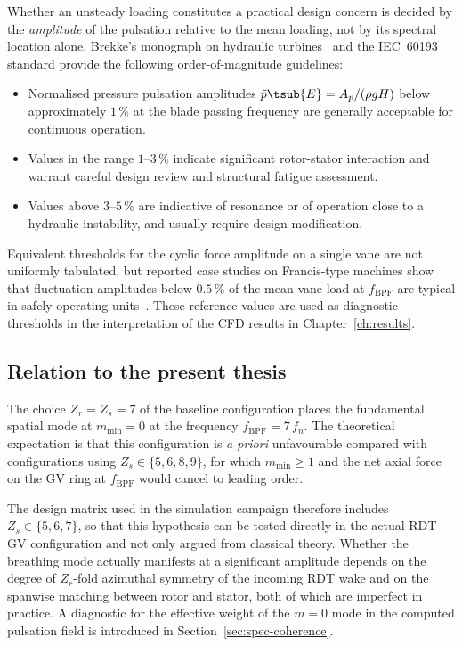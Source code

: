Whether an unsteady loading constitutes a practical design concern
is decided by the \emph{amplitude} of the pulsation relative to the
mean loading, not by its spectral location alone. Brekke's monograph
on hydraulic turbines~\cite{brekke,brekke2010} and the IEC~60193
standard provide the following order-of-magnitude guidelines:
\begin{itemize}
  \item Normalised pressure pulsation amplitudes
        $\tilde{p}\tsub{E} = A_p / (\rho g H)$ below approximately
        $1\,\%$ at the blade passing frequency are generally
        acceptable for continuous operation.
  \item Values in the range $1$--$3\,\%$ indicate significant
        rotor-stator interaction and warrant careful design review
        and structural fatigue assessment.
  \item Values above $3$--$5\,\%$ are indicative of resonance or of
        operation close to a hydraulic instability, and usually
        require design modification.
\end{itemize}
Equivalent thresholds for the cyclic force amplitude on a single
vane are not uniformly tabulated, but reported case studies on
Francis-type machines show that fluctuation amplitudes below
$0.5\,\%$ of the mean vane load at $f_{\mathrm{BPF}}$ are typical in
safely operating units~\cite{egusquiza2006}. These reference values
are used as diagnostic thresholds in the interpretation of the
\ac{CFD} results in Chapter~\ref{ch:results}.

\subsection{Relation to the present thesis}
\label{sec:rsi-thesis}

The choice $Z_r = Z_s = 7$ of the baseline configuration places the
fundamental spatial mode at $m_{\min} = 0$ at the frequency
$f_{\mathrm{BPF}} = 7\,f_n$. The theoretical expectation is that
this configuration is \emph{a priori} unfavourable compared with
configurations using $Z_s \in \{5,6,8,9\}$, for which
$m_{\min} \geq 1$ and the net axial force on the \ac{GV} ring at
$f_{\mathrm{BPF}}$ would cancel to leading order.

The design matrix used in the simulation campaign therefore includes
$Z_s \in \{5,6,7\}$, so that this hypothesis can be tested directly
in the actual \ac{RDT}--\ac{GV} configuration and not only argued
from classical theory. Whether the breathing mode actually
manifests at a significant amplitude depends on the degree of
$Z_r$-fold azimuthal symmetry of the incoming \ac{RDT} wake and on
the spanwise matching between rotor and stator, both of which are
imperfect in practice. A diagnostic for the effective weight of the
$m=0$ mode in the computed pulsation field is introduced in
Section~\ref{sec:spec-coherence}.

